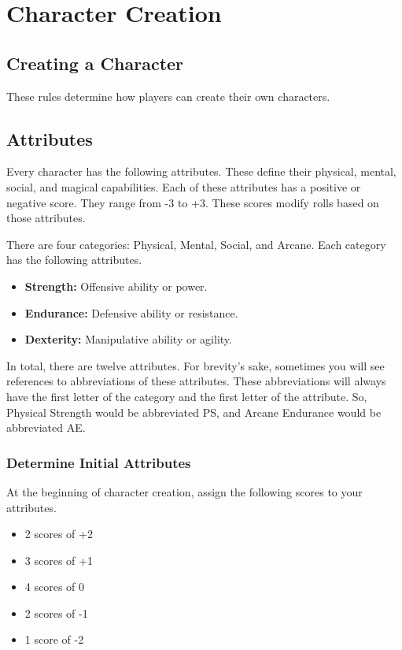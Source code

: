 \chapter{Character Creation}

\begin{multicols}{2}

\section{Creating a Character}

These rules determine how players can create their own characters.

\section{Attributes}

Every character has the following attributes. These define their
physical, mental, social, and magical capabilities. Each of these
attributes has a positive or negative score. They range from -3 to +3.
These scores modify rolls based on those attributes.

There are four categories: Physical, Mental, Social, and Arcane.
Each category has the following attributes.

\begin{itemize}
  \item \textbf{Strength:} Offensive ability or power.
  \item \textbf{Endurance:} Defensive ability or resistance.
  \item \textbf{Dexterity:} Manipulative ability or agility.
\end{itemize}

In total, there are twelve attributes. For brevity's sake, sometimes
you will see references to abbreviations of these attributes. These
abbreviations will always have the first letter of the category and
the first letter of the attribute. So, Physical Strength would be
abbreviated PS, and Arcane Endurance would be abbreviated AE.

\subsection{Determine Initial Attributes}

At the beginning of character creation, assign the following scores to
your attributes.

\begin{itemize}
  \item 2 scores of +2
  \item 3 scores of +1
  \item 4 scores of 0
  \item 2 scores of -1
  \item 1 score of -2
\end{itemize}


\end{multicols}
